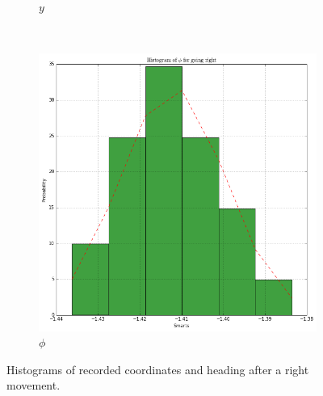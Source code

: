 \documentclass[paper=a4, fontsize=11pt]{scrartcl} %
\begin{document}
\begin{figure}[h!]
\begin{subfigure}[b]{0.3\textwidth}
        \caption{$y$}
    \end{subfigure}
    ~
    \begin{subfigure}[b]{0.3\textwidth}
        \setlength{\fboxsep}{0.5pt} %
        \setlength{\fboxrule}{0.5pt}
        \includegraphics[width=\textwidth,fbox]{images/histogram_5_phi_right.png}
        \caption{$\phi$}
    \end{subfigure}
    \caption{Histograms of recorded coordinates and heading after a right movement.}
\end{figure}
\end{document}
